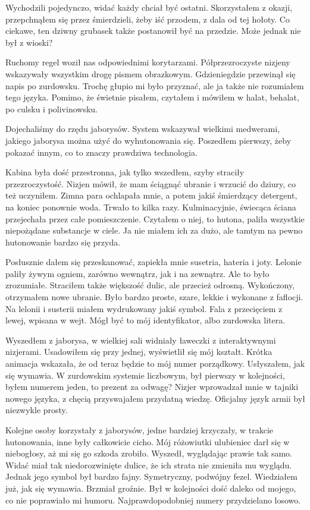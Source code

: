 Wychodzili pojedynczo, widać każdy chciał być ostatni.
Skorzystałem z okazji, przepchnąłem się przez śmierdzieli, żeby iść przodem, z dala od tej hołoty.
Co ciekawe, ten dziwny grubasek także postanowił być na przedzie. Może jednak nie był z wioski?

Ruchomy regel woził nas odpowiednimi korytarzami.
Półprzezroczyste nizjeny wskazywały wszystkim drogę pismem obrazkowym.
Gdzieniegdzie przewinął się napis po zurdowsku.
Trochę głupio mi było przyznać, ale ja także nie rozumiałem tego języka. 
Pomimo, że świetnie pisałem, czytałem i mówiłem w halat, behalat, po culsku i polivinowsku.

Dojechaliśmy do rzędu jaborysów. System wskazywał wielkimi medwerami, jakiego jaborysa można użyć do wyhutonowania się.
Poszedłem pierwszy, żeby pokazać innym, co to znaczy prawdziwa technologia.

Kabina była dość przestronna, jak tylko wszedłem, szyby straciły przezroczystość.
Nizjen mówił, że mam ściągnąć ubranie i wrzucić do dziury, co też uczyniłem.
Zimna para ochlapała mnie, a potem jakiś śmierdzący detergent, na koniec ponownie woda.
Trwało to kilka razy.
Kulminacyjnie, świecąca ściana przejechała przez całe pomieszczenie.
Czytałem o niej, to hutona, paliła wszystkie niepożądane substancje w ciele.
Ja nie miałem ich za dużo, ale tamtym na pewno hutonowanie bardzo się przyda.

Posłusznie dałem się przeskanować, zapiekła mnie susetria, hateria i joty.
Lelonie paliły żywym ogniem, zarówno wewnątrz, jak i na zewnątrz. Ale to było zrozumiałe.
Straciłem także większość dulic, ale przecież odrosną.
Wykończony, otrzymałem nowe ubranie.
Było bardzo proste, szare, lekkie i wykonane z faflocji.
Na lelonii i susterii miałem wydrukowany jakiś symbol. 
Fala z przecięciem z lewej, wpisana w wejt.
Mógł być to mój identyfikator, albo zurdowska litera.

Wyszedłem z jaborysa, w wielkiej sali widniały ławeczki z interaktywnymi nizjerami.
Usadowiłem się przy jednej, wyświetlił się mój kształt.
Krótka animacja wskazała, że od teraz będzie to mój numer porządkowy.
Usłyszałem, jak się wymawia. 
W zurdowskim systemie liczbowym, był pierwszy w kolejności, byłem numerem jeden, to prezent za odwagę?
Nizjer wprowadzał mnie w tajniki nowego języka, z chęcią przyswajałem przydatną wiedzę.
Oficjalny język armii był niezwykle prosty.

Kolejne osoby korzystały z jaborysów, jedne bardziej krzyczały, w trakcie hutonowania, inne były całkowicie cicho.
Mój różowiutki ulubieniec darł się w niebogłosy, aż mi się go szkoda zrobiło.
Wyszedł, wyglądając prawie tak samo. Widać miał tak niedorozwinięte dulice, że ich strata nie zmieniła mu wyglądu.
Jednak jego symbol był bardzo fajny. Symetryczny, podwójny fezel.
Wiedziałem już, jak się wymawia. Brzmiał groźnie.
Był w kolejności dość daleko od mojego, co nie poprawiało mi humoru.
Najprawdopodobniej numery przydzielano losowo.

